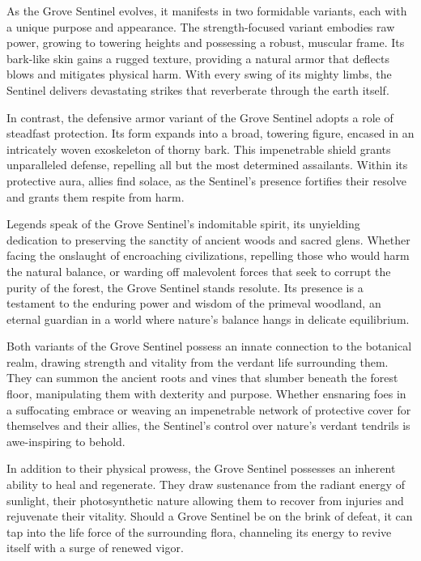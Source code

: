 \documentclass[letterpaper,openany,twoside,twocolumn]{book}
\begin{document}
As the Grove Sentinel evolves, it manifests in two formidable variants, each with a unique purpose and appearance. The strength-focused variant embodies raw power, growing to towering heights and possessing a robust, muscular frame. Its bark-like skin gains a rugged texture, providing a natural armor that deflects blows and mitigates physical harm. With every swing of its mighty limbs, the Sentinel delivers devastating strikes that reverberate through the earth itself.

In contrast, the defensive armor variant of the Grove Sentinel adopts a role of steadfast protection. Its form expands into a broad, towering figure, encased in an intricately woven exoskeleton of thorny bark. This impenetrable shield grants unparalleled defense, repelling all but the most determined assailants. Within its protective aura, allies find solace, as the Sentinel's presence fortifies their resolve and grants them respite from harm.

Legends speak of the Grove Sentinel's indomitable spirit, its unyielding dedication to preserving the sanctity of ancient woods and sacred glens. Whether facing the onslaught of encroaching civilizations, repelling those who would harm the natural balance, or warding off malevolent forces that seek to corrupt the purity of the forest, the Grove Sentinel stands resolute. Its presence is a testament to the enduring power and wisdom of the primeval woodland, an eternal guardian in a world where nature's balance hangs in delicate equilibrium.

 Both variants of the Grove Sentinel possess an innate connection to the botanical realm, drawing strength and vitality from the verdant life surrounding them. They can summon the ancient roots and vines that slumber beneath the forest floor, manipulating them with dexterity and purpose. Whether ensnaring foes in a suffocating embrace or weaving an impenetrable network of protective cover for themselves and their allies, the Sentinel's control over nature's verdant tendrils is awe-inspiring to behold.

 In addition to their physical prowess, the Grove Sentinel possesses an inherent ability to heal and regenerate. They draw sustenance from the radiant energy of sunlight, their photosynthetic nature allowing them to recover from injuries and rejuvenate their vitality. Should a Grove Sentinel be on the brink of defeat, it can tap into the life force of the surrounding flora, channeling its energy to revive itself with a surge of renewed vigor.
\end{document}
